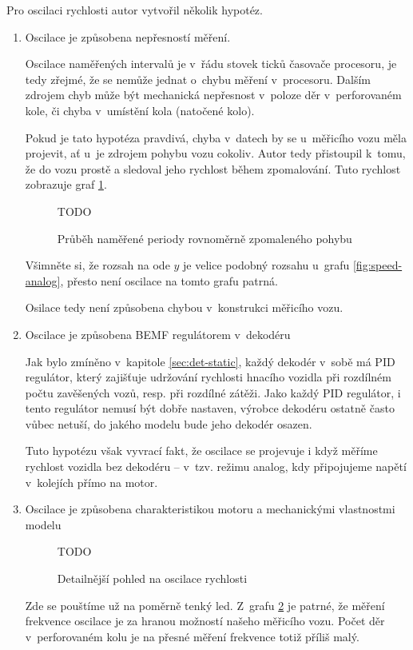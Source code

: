 Pro oscilaci rychlosti autor vytvořil několik hypotéz.

\begin{enumerate}
\item Oscilace je způsobena nepřesností měření.

Oscilace naměřených intervalů je v~řádu stovek ticků časovače procesoru, je tedy
zřejmé, že se nemůže jednat o~chybu měření v~procesoru. Dalším zdrojem chyb
může být mechanická nepřesnost v~poloze děr v~perforovaném kole, či chyba
v~umístění kola (natočené kolo).

Pokud je tato hypotéza pravdivá, chyba v~datech by se u~měřicího vozu měla
projevit, ať u~je zdrojem pohybu vozu cokoliv. Autor tedy přistoupil k~tomu,
že do vozu prostě  a sledoval jeho rychlost během zpomalování.
Tuto rychlost zobrazuje graf \ref{fig:speed-zduch}.

\begin{figure}[h]
TODO
\caption{Průběh naměřené periody rovnoměrně zpomaleného pohybu}
\label{fig:speed-zduch}
\end{figure}

Všimněte si, že rozsah na ode $y$ je velice podobný rozsahu u~grafu
\ref{fig:speed-analog}, přesto není oscilace na tomto grafu patrná.

Osilace tedy není způsobena chybou v~konstrukci měřicího vozu.

\item Oscilace je způsobena BEMF regulátorem v~dekodéru

Jak bylo zmíněno v~kapitole \ref{sec:det-static}, každý dekodér v~sobě má PID
regulátor, který zajišťuje udržování rychlosti hnacího vozidla při rozdílném
počtu zavěšených vozů, resp. při rozdílné zátěži. Jako každý PID regulátor,
i tento regulátor nemusí být dobře nastaven, výrobce dekodéru ostatně často
vůbec netuší, do jakého modelu bude jeho dekodér osazen.

Tuto hypotézu však vyvrací fakt, že oscilace se projevuje i když měříme rychlost
vozidla bez dekodéru -- v~tzv. režimu analog, kdy připojujeme napětí v~kolejích
přímo na motor.

\item Oscilace je způsobena charakteristikou motoru a mechanickými vlastnostmi
modelu

\begin{figure}[h]
TODO
\caption{Detailnější pohled na oscilace rychlosti}
\label{fig:speed-presny}
\end{figure}

Zde se pouštíme už na poměrně tenký led. Z~grafu \ref{fig:speed-presny} je
patrné, že měření frekvence oscilace je za hranou možností našeho měřicího
vozu. Počet děr v~perforovaném kolu je na přesné měření frekvence totiž příliš
malý.


\end{enumerate}
